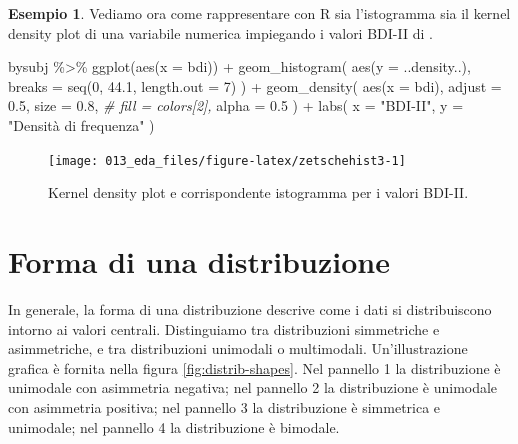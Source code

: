 \documentclass[
  10pt,
  italian,
  a4paper,
  extrafontsizes,onecolumn,openright
  ]{memoir}
\newenvironment{Shaded}{\begin{snugshade}}{\end{snugshade}}
\newcommand{\AttributeTok}[1]{\textcolor[rgb]{0.77,0.63,0.00}{#1}}
\newcommand{\CommentTok}[1]{\textcolor[rgb]{0.56,0.35,0.01}{\textit{#1}}}
\newcommand{\DecValTok}[1]{\textcolor[rgb]{0.00,0.00,0.81}{#1}}
\newcommand{\FloatTok}[1]{\textcolor[rgb]{0.00,0.00,0.81}{#1}}
\newcommand{\FunctionTok}[1]{\textcolor[rgb]{0.00,0.00,0.00}{#1}}
\newcommand{\NormalTok}[1]{#1}
\newcommand{\SpecialCharTok}[1]{\textcolor[rgb]{0.00,0.00,0.00}{#1}}
\newcommand{\StringTok}[1]{\textcolor[rgb]{0.31,0.60,0.02}{#1}}
\theoremstyle{definition}
\theoremstyle{definition}
\newtheorem{example}{Esempio}[chapter]
\theoremstyle{definition}
\theoremstyle{definition}
\theoremstyle{remark}
\begin{document}
\begin{example}

Vediamo ora come rappresentare con R sia l'istogramma sia il kernel density plot di una variabile numerica impiegando i valori BDI-II di \textcite{zetschefuture2019}.

\begin{Shaded}
\begin{Highlighting}[]
\NormalTok{bysubj }\SpecialCharTok{\%\textgreater{}\%}
  \FunctionTok{ggplot}\NormalTok{(}\FunctionTok{aes}\NormalTok{(}\AttributeTok{x =}\NormalTok{ bdi)) }\SpecialCharTok{+}
  \FunctionTok{geom\_histogram}\NormalTok{(}
    \FunctionTok{aes}\NormalTok{(}\AttributeTok{y =}\NormalTok{ ..density..),}
    \AttributeTok{breaks =} \FunctionTok{seq}\NormalTok{(}\DecValTok{0}\NormalTok{, }\FloatTok{44.1}\NormalTok{, }\AttributeTok{length.out =} \DecValTok{7}\NormalTok{)}
\NormalTok{  ) }\SpecialCharTok{+}
  \FunctionTok{geom\_density}\NormalTok{(}
    \FunctionTok{aes}\NormalTok{(}\AttributeTok{x =}\NormalTok{ bdi),}
    \AttributeTok{adjust =} \FloatTok{0.5}\NormalTok{,}
    \AttributeTok{size =} \FloatTok{0.8}\NormalTok{,}
    \CommentTok{\# fill = colors[2],}
    \AttributeTok{alpha =} \FloatTok{0.5}
\NormalTok{  ) }\SpecialCharTok{+}
  \FunctionTok{labs}\NormalTok{(}
    \AttributeTok{x =} \StringTok{"BDI{-}II"}\NormalTok{,}
    \AttributeTok{y =} \StringTok{"Densità di frequenza"}
\NormalTok{  )}
\end{Highlighting}
\end{Shaded}

\begin{figure}[h]

{\centering \texttt{[image: 013\_eda\_files/figure-latex/zetschehist3-1]} 

}

\caption{Kernel density plot e corrispondente istogramma per i valori BDI-II.}\label{fig:zetschehist3}
\end{figure}

\end{example}

\hypertarget{forma-di-una-distribuzione}{%
\section{Forma di una distribuzione}\label{forma-di-una-distribuzione}}

In generale, la forma di una distribuzione descrive come i dati si distribuiscono intorno ai valori centrali. Distinguiamo tra distribuzioni simmetriche e asimmetriche, e tra distribuzioni unimodali o multimodali. Un'illustrazione grafica è fornita nella figura \ref{fig:distrib-shapes}. Nel pannello 1 la distribuzione è unimodale con asimmetria negativa; nel pannello 2 la distribuzione è unimodale con asimmetria positiva; nel pannello 3 la distribuzione è simmetrica e unimodale; nel pannello 4 la distribuzione è bimodale.
\end{document}
